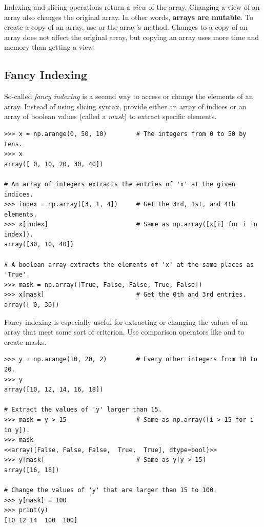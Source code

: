 
\begin{info} %
Indexing and slicing operations return a \emph{view} of the array.
Changing a view of an array also changes the original array.
In other words, \textbf{arrays are mutable}.
To create a copy of an array, use  or the array's  method.
Changes to a copy of an array does not affect the original array, but copying an array uses more time and memory than getting a view.
\end{info}

\subsection*{Fancy Indexing} %

So-called \emph{fancy indexing} is a second way to access or change the elements of an array.
Instead of using slicing syntax, provide either an array of indices or an array of boolean values (called a \emph{mask}) to extract specific elements.

\begin{lstlisting}
>>> x = np.arange(0, 50, 10)        # The integers from 0 to 50 by tens.
>>> x
array([ 0, 10, 20, 30, 40])

# An array of integers extracts the entries of 'x' at the given indices.
>>> index = np.array([3, 1, 4])     # Get the 3rd, 1st, and 4th elements.
>>> x[index]                        # Same as np.array([x[i] for i in index]).
array([30, 10, 40])

# A boolean array extracts the elements of 'x' at the same places as 'True'.
>>> mask = np.array([True, False, False, True, False])
>>> x[mask]                         # Get the 0th and 3rd entries.
array([ 0, 30])
\end{lstlisting}

Fancy indexing is especially useful for extracting or changing the values of an array that meet some sort of criterion.
Use comparison operators like \li{<} and \li{==} to create masks.

\begin{lstlisting}
>>> y = np.arange(10, 20, 2)        # Every other integers from 10 to 20.
>>> y
array([10, 12, 14, 16, 18])

# Extract the values of 'y' larger than 15.
>>> mask = y > 15                   # Same as np.array([i > 15 for i in y]).
>>> mask
<<array([False, False, False,  True,  True], dtype=bool)>>
>>> y[mask]                         # Same as y[y > 15]
array([16, 18])

# Change the values of 'y' that are larger than 15 to 100.
>>> y[mask] = 100
>>> print(y)
[10 12 14  100  100]
\end{lstlisting}

